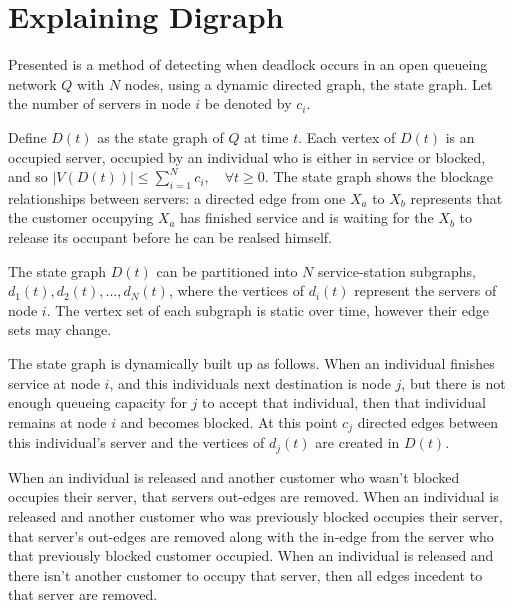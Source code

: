 \documentclass{article}
\begin{document}
\section{Explaining Digraph}

Presented is a method of detecting when deadlock occurs in an open queueing network $Q$ with $N$ nodes, using a dynamic directed graph, the state graph.
Let the number of servers in node $i$ be denoted by $c_i$.\newline

Define $D(t)$ as the state graph of $Q$ at time $t$.
Each vertex of $D(t)$ is an occupied server, occupied by an individual who is either in service or blocked, and so $\left| V\left(D\left(t\right)\right) \right| \leq \sum_{i=1}^N c_i, \quad \forall t \geq 0$.
The state graph shows the blockage relationships between servers: a directed edge from one $X_a$ to $X_b$ represents that the customer occupying $X_a$ has finished service and is waiting for the $X_b$ to release its occupant before he can be realsed himself.\newline

The state graph $D(t)$ can be partitioned into $N$ service-station subgraphs, $d_1(t), d_2(t), ..., d_N(t)$, where the vertices of $d_i(t)$ represent the servers of node $i$.
The vertex set of each subgraph is static over time, however their edge sets may change.\newline

The state graph is dynamically built up as follows.
When an individual finishes service at node $i$, and this individuals next destination is node $j$, but there is not enough queueing capacity for $j$ to accept that individual, then that individual remains at node $i$ and becomes blocked.
At this point $c_j$ directed edges between this individual's server and the vertices of $d_j(t)$ are created in $D(t)$.\newline

When an individual is released and another customer who wasn't blocked occupies their server, that servers out-edges are removed.
When an individual is released and another customer who was previously blocked occupies their server, that server's out-edges are removed along with the in-edge from the server who that previously blocked customer occupied.
When an individual is released and there isn't another customer to occupy that server, then all edges incedent to that server are removed.\newline
\end{document}

